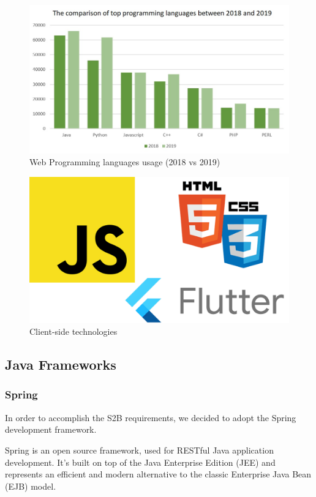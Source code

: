 \documentclass[table, 12pt]{article}
\begin{document}
\begin{figure}[H]
    \includegraphics[width=\textwidth]{assets/graph-18-19-languages.jpg}
    \caption{Web Programming languages usage (2018 vs 2019)}
    \label{languages_comparison}
\end{figure}

\begin{figure}[H]
    \includegraphics[width=\textwidth]{assets/client-side-scripting.png}
    \caption{Client-side technologies}
\end{figure}

\subsection{Java Frameworks}
\subsubsection{Spring}
\label{spring}
In order to accomplish the S2B requirements, we decided to adopt the Spring development framework.

Spring is an open source framework, used for RESTful Java application development. It's built on top of the Java Enterprise Edition (JEE) and represents an efficient and modern alternative to the classic Enterprise Java Bean (EJB) model.
\end{document}
